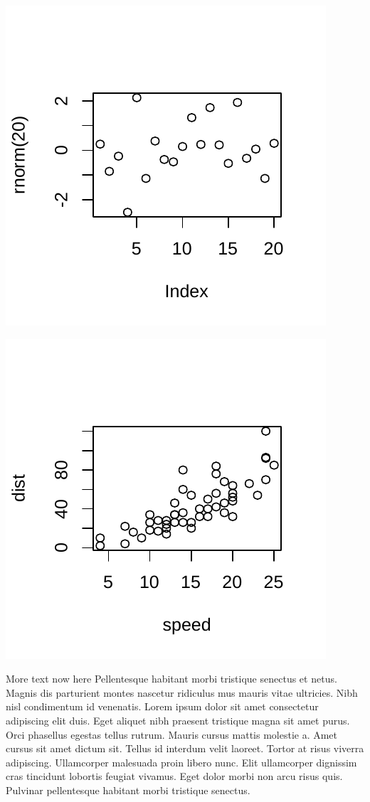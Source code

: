 \documentclass[30pt,extrafontsizes]{memoir}
\begin{document}
\begin{multicols*}{3}
{\begin{center}\includegraphics[width=0.65\linewidth]{skeleton_files/figure-latex/unnamed-chunk-4-1} \end{center}

\begin{center}\includegraphics[width=0.65\linewidth]{skeleton_files/figure-latex/unnamed-chunk-4-2} \end{center}

More text now here Pellentesque habitant morbi tristique senectus et
netus. Magnis dis parturient montes nascetur ridiculus mus mauris vitae
ultricies. Nibh nisl condimentum id venenatis. Lorem ipsum dolor sit
amet consectetur adipiscing elit duis. Eget aliquet nibh praesent
tristique magna sit amet purus. Orci phasellus egestas tellus rutrum.
Mauris cursus mattis molestie a. Amet cursus sit amet dictum sit. Tellus
id interdum velit laoreet. Tortor at risus viverra adipiscing.
Ullamcorper malesuada proin libero nunc. Elit ullamcorper dignissim cras
tincidunt lobortis feugiat vivamus. Eget dolor morbi non arcu risus
quis. Pulvinar pellentesque habitant morbi tristique senectus.
\printbibliography
}
\end{multicols*}

\end{document}
